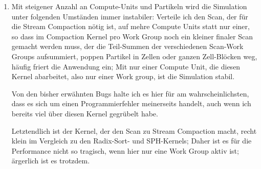 \begin{enumerate}
		\item 
		\label{enum:oclSyncBug}		
		Mit steigener Anzahl an Compute-Units und Partikeln wird die Simulation unter folgenden Umständen immer instabiler:
		Verteile ich den Scan, der für die Stream Compaction nötig ist, auf mehre Compute Units statt nur einer,
		so dass im Compaction Kernel pro Work Group noch ein kleiner finaler Scan gemacht werden muss,
		der die Teil-Summen der verschiedenen Scan-Work Groups aufsummiert, poppen Partikel
		in Zellen oder ganzen Zell-Blöcken weg, häufig friert die Anwendung ein; 
		Mit nur einer Compute Unit, die diesen Kernel abarbeitet, also nur einer Work group, ist die Simulation stabil.
		
		Von den bisher erwähnten Bugs halte ich es hier für am wahrscheinlichsten, dass es sich um einen Programmierfehler 
		meinerseits handelt, auch wenn ich bereits viel über diesen Kernel gegrübelt habe.
		
		Letztendlich ist der Kernel, der den Scan zu Stream Compaction macht, recht klein im Vergleich zu den
		Radix-Sort- und SPH-Kernels; Daher ist es für die Performance nicht so tragisch, wenn hier nur eine Work 
		Group aktiv ist; ärgerlich ist es trotzdem.
		\end{enumerate}

\clearpage
